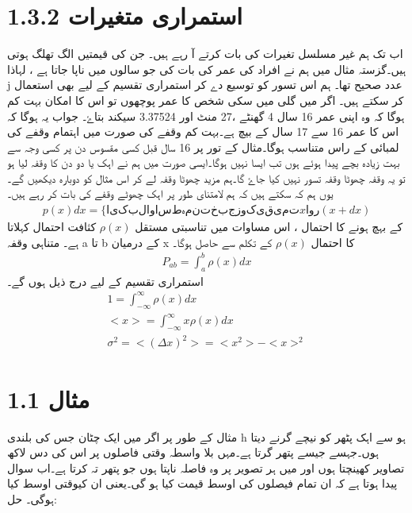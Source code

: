 \documentclass{article}
\begin{document}
\section*{1.3.2  استمراری متغیرات}
اب تک ہم غیر مسلسل تغیرات کی بات کرتے آ رہے ہیں۔ جن کی قیمتیں الگ تھلگ ہوتی ہیں۔گزستہ مثال میں ہم نے افراد کی عمر کی بات کی جو سالوں میں ناپا جاتا ہے ، لہاذا j عدد صحیح تھا۔ ہم اس تسور کو توسیع دے کر  استمراری تقسیم کے لیے بھی استعمال کر سکتے ہیں۔ اگر میں گلی میں سکی شخص کا عمر پوچھوں تو اس کا امکان بہت کم ہوگا کہ وہ اپنی عمر 16 سال 4 گھنٹے ،27 منٹ اور 3.37524 سیکند بتاۓ۔ جواب یہ ہوگا کہ اس کا عمر 16 سے 17 سال کے بیچ ہے۔بہت کم وقفے کی صورت میں اہتمام وقفے کی لمبائی کے راس متناسب ہوگا۔مثال کے تور پر 16 سال قبل کسی مقسوس دن پر کسی وجہ سے بہت زیادہ بچے پیدا ہوئے ہوں تب ایسا نہیں ہوگا۔ایسی صورت میں ہم نے اہک یا دو دن کا وقفہ لیا ہو تو یہ وقفہ چھوٹا وقفہ تسور نہیں کیا جاۓ گا۔ہم مزید چھوٹا وقفہ لے کر اس مثال کو دوبارہ دیکھیں گے۔یوں ہم کہ سکتے ہیں کہ ہم لامتنای طور پر اہک چھوٹے وقفے کی بات کر رہے ہیں۔
\begin{align}
 p(x)dx =\lbrace ایک بلا واسطہ منتخب جزو کی قیمت x اور (x+dx)  
\end{align}
 کے بہچ ہونے کا احتمال ، اس مساوات میں تناسبتی مستقل $ \rho(x) $ کثافت احتمال کہلاتا ہے۔
 متناہی وقفہ a تا b کے درمیان x کا احتمال $ \rho(x) $ کے تکلم سے حاصل ہوگا۔
 \begin{align}
 P_{ab}=\int_a^b \rho(x)dx 
 \end{align}
 استمراری تقسیم کے لیے درج ذیل ہوں گے۔
\begin{align}
1=\int_{-\infty}^{\infty} \rho(x)dx  \\
<x> =\int_{-\infty}^{\infty} x\rho(x)dx \\
 \sigma^2=<(\Delta x)^2> = <x^2>-<x>^2 
\end{align}

\section*{مثال 1.1}
مثال کے طور پر اگر میں ایک چٹان جس کی بلندی h ہو سے اہک پٹھر کو نیچے گرنے دیتا ہوں۔جہسے جیسے پتھر گرتا ہے۔مہں بلا واسطہ وقتی فاصلوں پر اس کی دس لاکھ تصاویر کھینچتا ہوں اور میں ہر تصویر پر وہ فاصلہ ناپتا ہوں جو پتھر تہ کرتا ہے۔اب سوال پیدا ہوتا ہے کہ ان تمام فیصلوں کی اوسط قیمت کیا ہو گی۔یعنی ان کیوقتی اوسط کیا ہوگی۔ 
حل: 
\end{document}
